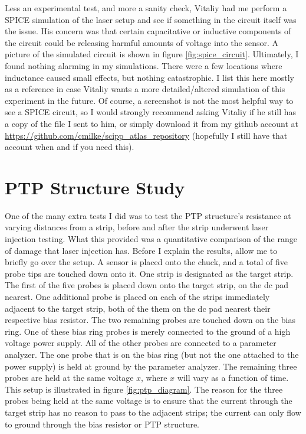 \documentclass{report}
\begin{document}
            Less an experimental test, and more a sanity check, Vitaliy had me perform a SPICE simulation of the laser setup and see if something in the circuit itself was the issue. His concern was that certain capacitative or inductive components of the circuit could be releasing harmful amounts of voltage into the sensor. A picture of the simulated circuit is shown in figure \ref{fig:spice_circuit}. Ultimately, I found nothing alarming in my simulations. There were a few locations where inductance caused small effects, but nothing catastrophic. I list this here mostly as a reference in case Vitaliy wants a more detailed/altered simulation of this experiment in the future. Of course, a screenshot is not the most helpful way to see a SPICE circuit, so I would strongly recommend asking Vitaliy if he still has a copy of the file I sent to him, or simply download it from my github account at \url{https://github.com/cmilke/scipp\_atlas\_repository} (hopefully I still have that account when and if you need this).



        \section{PTP Structure Study} \label{sect:ptp_study}
            One of the many extra tests I did was to test the PTP structure's resistance at varying distances from a strip, before and after the strip underwent laser injection testing. What this provided was a quantitative comparison of the range of damage that laser injection has. Before I explain the results, allow me to briefly go over the setup. A sensor is placed onto the chuck, and a total of five probe tips are touched down onto it. One strip is designated as the target strip. The first of the five probes is placed down onto the target strip, on the dc pad nearest. One additional probe is placed on each of the strips immediately adjacent to the target strip, both of the them on the dc pad nearest their respective bias resistor. The two remaining probes are touched down on the bias ring. One of these bias ring probes is merely connected to the ground of a high voltage power supply. All of the other probes are connected to a parameter analyzer. The one probe that is on the bias ring (but not the one attached to the power supply) is held at ground by the parameter analyzer. The remaining three probes are held at the same voltage $x$, where $x$ will vary as a function of time. This setup is illustrated in figure \ref{fig:ptp_diagram}. The reason for the three probes being held at the same voltage is to ensure that the current through the target strip has no reason to pass to the adjacent strips; the current can only flow to ground through the bias resistor or PTP structure.
\end{document}
